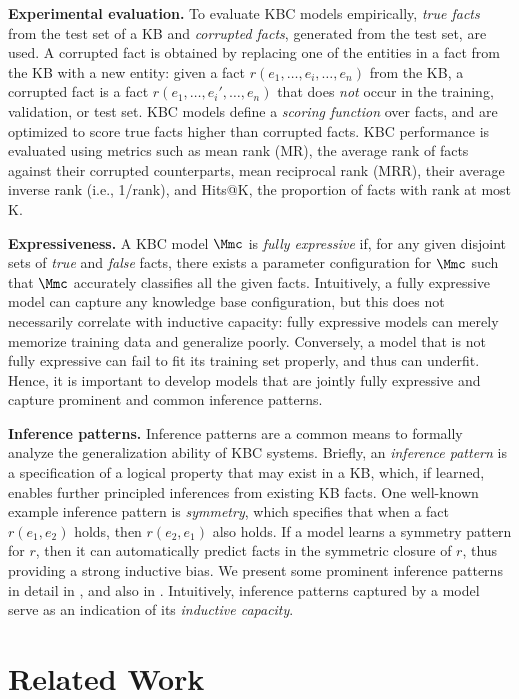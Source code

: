 \documentclass{article}
\begin{document}
\textbf{Experimental evaluation.} To evaluate KBC models empirically, \emph{true facts} from the test set of a KB and \emph{corrupted facts}, generated from the test set, are used.
A corrupted fact is obtained by replacing one of the entities in a fact from the KB with a new entity: given a fact $r(e_1, \ldots, e_i, \ldots, e_n)$ from the KB, a corrupted fact is a fact $r(e_1,\ldots,e_i',\ldots,e_n)$ that does \emph{not} occur in the training, validation, or test set.
KBC models define a \emph{scoring function} over facts, and are optimized to score true facts higher than corrupted facts. KBC performance is evaluated using metrics \cite{TransE-NIPS13} such as mean rank (MR), the average rank of facts against their corrupted counterparts, mean reciprocal rank (MRR), their average inverse rank (i.e., 1/rank), and  Hits@K, the proportion of facts with rank at most K. 

\textbf{Expressiveness.} A KBC model $\Mmc$ is  \emph{fully expressive} if, for any given disjoint sets of \emph{true} and \emph{false} facts, there exists a parameter configuration for $\Mmc$ such that $\Mmc$ accurately classifies all the given facts. 
Intuitively, a fully expressive model can capture any knowledge base configuration, but this does not necessarily correlate with inductive capacity: fully expressive models can merely memorize training data and generalize poorly. Conversely, a model that is not fully expressive can fail to fit its training set properly, and thus can underfit. Hence, it is important to develop models that are jointly fully expressive and capture prominent and common inference patterns.

\textbf{Inference patterns.}
Inference patterns are a common means to formally analyze the generalization ability of KBC systems. Briefly, an \emph{inference pattern} is a specification of a logical property that may exist in a KB, which, if learned, enables further principled inferences from existing KB facts.
One well-known example inference pattern is \emph{symmetry}, which specifies that when a fact $r(e_1, e_2)$ holds, then $r(e_2, e_1)$ also holds. If a model learns a symmetry pattern for $r$, then it can automatically predict facts in the symmetric closure of $r$, thus providing a strong inductive bias. 
We present some prominent inference patterns in detail in , and also in . Intuitively, inference patterns captured by a model serve as an indication of its \emph{inductive capacity}.

\section{Related Work}
\end{document}
